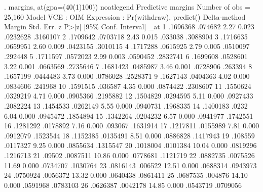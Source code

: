 . margins, at(gpa=(40(1)100)) noatlegend
{\smallskip}
Predictive margins                              Number of obs     =     25,160
Model VCE    : OIM
{\smallskip}
Expression   : Pr(withdraw), predict()
{\smallskip}
             {\VBAR}            Delta-method
             {\VBAR}     Margin   Std. Err.      z    P>|z|     [95\% Conf. Interval]
         _at {\VBAR}
          1  {\VBAR}   .1696368    .074682     2.27   0.023     .0232628    .3160107
          2  {\VBAR}   .1709642   .0703718     2.43   0.015      .033038    .3088904
          3  {\VBAR}   .1716635   .0659951     2.60   0.009     .0423155    .3010115
          4  {\VBAR}   .1717288   .0615925     2.79   0.005     .0510097     .292448
          5  {\VBAR}   .1711597   .0572023     2.99   0.003     .0590452    .2832741
          6  {\VBAR}   .1699608   .0528601     3.22   0.001     .0663569    .2735646
          7  {\VBAR}   .1681423   .0485987     3.46   0.001     .0728906     .263394
          8  {\VBAR}   .1657199   .0444483     3.73   0.000     .0786028    .2528371
          9  {\VBAR}   .1627143   .0404363     4.02   0.000     .0834606     .241968
         10  {\VBAR}   .1591515    .036587     4.35   0.000     .0874422    .2308607
         11  {\VBAR}   .1550624   .0329219     4.71   0.000     .0905366    .2195882
         12  {\VBAR}   .1504829   .0294595     5.11   0.000     .0927433    .2082224
         13  {\VBAR}   .1454533   .0262149     5.55   0.000     .0940731    .1968335
         14  {\VBAR}   .1400183      .0232     6.04   0.000     .0945472    .1854894
         15  {\VBAR}   .1342264   .0204232     6.57   0.000     .0941977    .1742551
         16  {\VBAR}   .1281292   .0178892     7.16   0.000      .093067    .1631914
         17  {\VBAR}   .1217811   .0155989     7.81   0.000     .0912079    .1523544
         18  {\VBAR}   .1152385   .0135491     8.51   0.000     .0886828    .1417943
         19  {\VBAR}    .108559   .0117327     9.25   0.000     .0855634    .1315547
         20  {\VBAR}   .1018004   .0101384    10.04   0.000     .0819296    .1216713
         21  {\VBAR}     .09502   .0087511    10.86   0.000     .0778681    .1121719
         22  {\VBAR}   .0882735   .0075526    11.69   0.000     .0734707    .1030764
         23  {\VBAR}   .0816143    .006522    12.51   0.000     .0688314    .0943973
         24  {\VBAR}   .0750924   .0056372    13.32   0.000     .0640438    .0861411
         25  {\VBAR}   .0687535    .004876    14.10   0.000     .0591968    .0783103
         26  {\VBAR}   .0626387   .0042178    14.85   0.000     .0543719    .0709056
